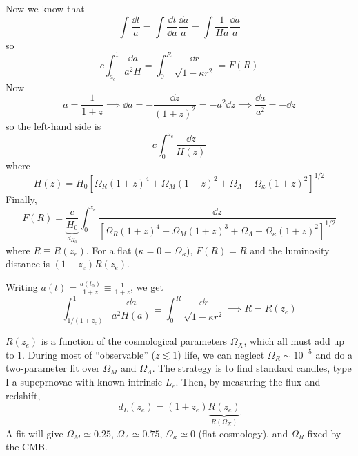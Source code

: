 \documentclass[a4paper,twoside,master.tex]{subfiles}
\begin{document}
\begin{itemize}
\begin{equation}
        \end{equation}
        Now we know that
        \begin{equation}
            \int \frac{\dd{t}}{a} = \int \frac{\dd{t}}{\dd{a}} \frac{\dd{a}}{a} = \int \frac{1}{Ha} \frac{\dd{a}}{a}
        \end{equation}
        so
        \begin{equation}
            c \int_{a_e}^1 \frac{\dd{a}}{a^2 H} = \int_0^R \frac{\dd{r}}{\sqrt{1 - \kappa r^2}} = F(R)
        \end{equation}
        Now
        \begin{equation}
            a = \frac{1}{1 + z} \implies \dd{a} = - \frac{\dd{z}}{(1 + z)^2} = - a^2 \dd{z} \implies \frac{\dd{a}}{a^2} = - \dd{z}
        \end{equation}
        so the left-hand side is
        \begin{equation}
            c \int_0^{z_e} \frac{\dd{z}}{H(z)}
        \end{equation}
        where
        \begin{equation}
            H(z) = H_0 \left[ \Omega_R (1 + z)^4 + \Omega_M (1 + z)^2 + \Omega_{\Lambda} + \Omega_{\kappa} (1 + z)^2 \right]^{1/2}
        \end{equation}
        Finally,
        \begin{equation}
            F(R) = \underbrace{\frac{c}{H_0}}_{d_{H_0}} \int_0^{z_e} \frac{\dd{z}}{\left[ \Omega_R (1 + z)^4 + \Omega_M (1 + z)^3 + \Omega_{\Lambda} + \Omega_{\kappa} (1 + z)^2 \right]^{1/2}}
        \end{equation}
        where $ R \equiv R(z_e) $. For a flat ($ \kappa = 0 = \Omega_{\kappa} $), $ F(R) = R $ and the luminosity distance is $ (1 + z_e)R(z_e) $.

    Writing $ a(t) = \frac{a(t_0)}{1 + z} \equiv \frac{1}{1 + z} $, we get
    \begin{equation}
        \int_{1/(1+z_e)}^1 \frac{\dd{a}}{a^2 H(a)} \equiv \int_0^R \frac{\dd{r}}{\sqrt{1 - \kappa r^2}} \implies R = R(z_e)
    \end{equation}

    $ R(z_e) $ is a function of the cosmological parameters $ \Omega_{X} $, which all must add up to $ 1 $. During most of ``observable'' ($ z \lesssim 1 $) life, we can neglect $ \Omega_R \sim 10^{-5} $ and do a two-parameter fit over $ \Omega_M $ and $ \Omega_{\Lambda} $. The strategy is to find standard candles, type I-a supeprnovae with known intrinsic $ L_e $. Then, by measuring the flux and redshift,
    \begin{equation}
        d_L(z_e) = (1 + z_e)\underbrace{R(z_e)}_{R(\Omega_X)}
    \end{equation}
    A fit will give $ \Omega_M \simeq 0.25 $, $ \Omega_{\Lambda} \simeq 0.75 $, $ \Omega_{\kappa} \simeq 0 $ (flat cosmology), and $ \Omega_R $ fixed by the CMB.
\end{itemize}
\end{document}
